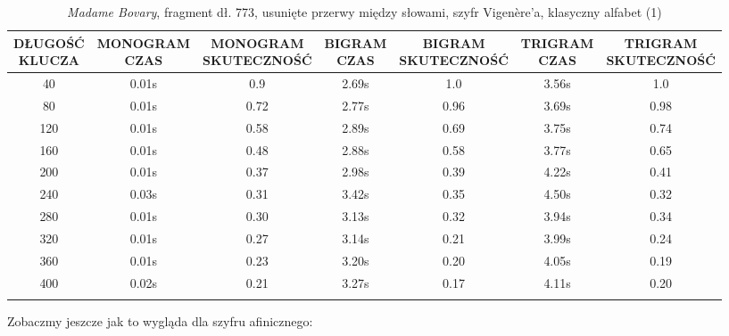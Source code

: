 \documentclass[a4paper]{article}
\theoremstyle{defn}
\theoremstyle{theorem}
\theoremstyle{lemma}
\theoremstyle{cor}
\theoremstyle{fact}
\begin{document}
\begin{center}\begin{small}\begin{longtable}{|c|c|c|c|c|c|c|}
\hline \makecell{DŁUGOŚĆ\\KLUCZA} &  \makecell{MONOGRAM\\CZAS} & \makecell{MONOGRAM\\SKUTECZNOŚĆ} & \makecell{BIGRAM\\CZAS} &  \makecell{BIGRAM\\SKUTECZNOŚĆ} & \makecell{TRIGRAM\\CZAS} & \makecell{TRIGRAM\\SKUTECZNOŚĆ}\\ \hline
40 & 0.01s & 0.9 & 2.69s & 1.0 & 3.56s & 1.0 \\ \hline
80 & 0.01s & 0.72 & 2.77s & 0.96 & 3.69s & 0.98 \\ \hline
120 & 0.01s & 0.58 & 2.89s & 0.69 & 3.75s & 0.74 \\ \hline
160 & 0.01s & 0.48 & 2.88s & 0.58 & 3.77s & 0.65 \\ \hline
200 & 0.01s & 0.37 & 2.98s & 0.39 & 4.22s & 0.41 \\ \hline
240 & 0.03s & 0.31 & 3.42s & 0.35 & 4.50s & 0.32 \\ \hline
280 & 0.01s & 0.30 & 3.13s & 0.32 & 3.94s & 0.34 \\ \hline
320 & 0.01s & 0.27 & 3.14s & 0.21 & 3.99s & 0.24 \\ \hline
360 & 0.01s & 0.23 & 3.20s & 0.20 & 4.05s & 0.19 \\ \hline
400 & 0.02s & 0.21 & 3.27s & 0.17 & 4.11s & 0.20 \\ \hline
\caption{\textit{Madame Bovary}, fragment dł. 773, usunięte przerwy między słowami, szyfr Vigenère'a, klasyczny alfabet (1)}
\end{longtable}\end{small}\end{center}
Zobaczmy jeszcze jak to wygląda dla szyfru afinicznego:
\end{document}
